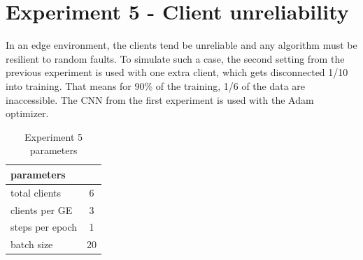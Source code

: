 \begin{center}
\end{center}
    
\section{Experiment 5 - Client unreliability}
In an edge environment, the clients tend be unreliable and any algorithm must be resilient to random faults. To simulate such a case, the second setting from the previous experiment is used with one extra client, which gets disconnected 1/10 into training. That means for 90\% of the training, 1/6 of the data are inaccessible. The CNN from the first experiment is used with the Adam optimizer.

\begin{table}[H]
    \center
    \begin{tabular}
        {
            | l | c |
        }
        parameters\\\hline
        total clients   & 6\\\hline
        clients per GE  & 3\\\hline
        steps per epoch & 1\\\hline
        batch size      & 20\\\hline
    \end{tabular}
    \caption{Experiment 5 parameters}
\end{table}
    
